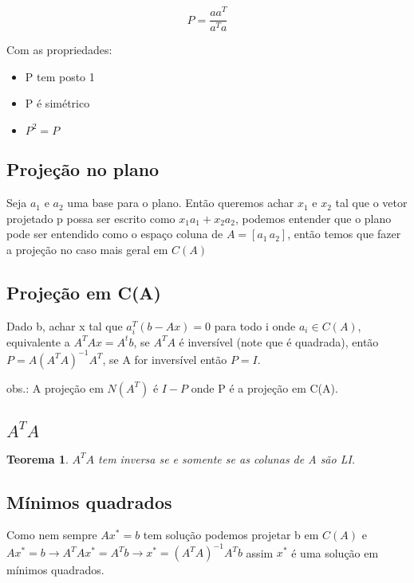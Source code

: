 \documentclass[12pt]{article}
\newtheorem{theorem}{Teorema}
\begin{document}
$$P = \dfrac{a a^T}{a^T a}$$

Com as propriedades:
\begin{itemize}
    \item P tem posto 1
    \item P é simétrico
    \item $P^2 = P$
\end{itemize}

\subsection*{Projeção no plano}
Seja $a_1$ e $a_2$ uma base para o plano. Então queremos achar $x_1$ e $x_2$ tal que o vetor projetado p possa ser escrito como $x_1 a_1 + x_2 a_2$, podemos entender que o plano pode ser entendido como o espaço coluna de $A = \left[a_1 \, a_2\right]$, então temos que fazer a projeção no caso mais geral em $C(A)$

\subsection*{Projeção em C(A)}
Dado b, achar x tal que $a_i^T (b - Ax) = 0$ para todo i onde $a_i \in C(A)$, equivalente a $A^T Ax = A^t b$, se $A^T A$ é inversível (note que é quadrada), então $P = A(A^T A)^{-1} A^T$, se A for inversível então $P = I$.

obs.: A projeção em $N(A^T)$ é $I - P$ onde P é a projeção em C(A).

\subsection*{$A^T A$}
\begin{theorem}
$A^T A$ tem inversa se e somente se as colunas de A são LI.
\end{theorem}

\subsection*{Mínimos quadrados}
Como nem sempre $Ax^* = b$ tem solução podemos projetar b em $C(A)$ e $Ax^* = b \xrightarrow{} A^T Ax^* = A^T b \xrightarrow{} x^* = (A^T A)^{-1} A^T b$ assim $x^*$ é uma solução em mínimos quadrados.
\end{document}
